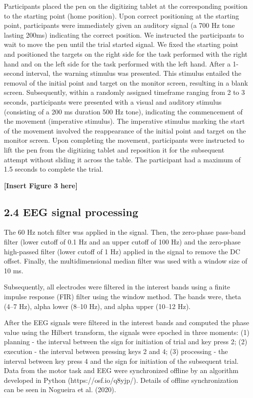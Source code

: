 \documentclass[man,a4paper,12pt,floatsintext]{apa6}
\begin{document}
Participants placed the pen on the digitizing tablet at the corresponding position to the starting point (home position). Upon correct positioning at the starting point, participants were immediately given an auditory signal (a 700 Hz tone lasting 200ms) indicating the correct position. We instructed the participants to wait to move the pen until the trial started signal. We fixed the starting point and positioned the targets on the right side for the task performed with the right hand and on the left side for the task performed with the left hand. After a 1-second interval, the warning stimulus was presented. This stimulus entailed the removal of the initial point and target on the monitor screen, resulting in a blank screen. Subsequently, within a randomly assigned timeframe ranging from 2 to 3 seconds, participants were presented with a visual and auditory stimulus (consisting of a 200 ms duration 500 Hz tone), indicating the commencement of the movement (imperative stimulus). The imperative stimulus marking the start of the movement involved the reappearance of the initial point and target on the monitor screen. Upon completing the movement, participants were instructed to lift the pen from the digitizing tablet and reposition it for the subsequent attempt without sliding it across the table. The participant had a maximum of 1.5 seconds to complete the trial.

\begin{center}
\textbf{[Insert Figure 3 here]}
\end{center}

\subsection{2.4 EEG signal processing}
The 60 Hz notch filter was applied in the signal. Then, the zero-phase pass-band filter (lower cutoff of 0.1 Hz and an upper cutoff of 100 Hz) and the zero-phase high-passed filter (lower cutoff of 1 Hz) applied in the signal to remove the DC offset. Finally, the multidimensional median filter was used with a window size of 10 ms.

Subsequently, all electrodes were filtered in the interest bands using a finite impulse response (FIR) filter using the window method. The bands were, theta (4–7 Hz), alpha lower (8–10 Hz), and alpha upper (10–12 Hz).

After the EEG signals were filtered in the interest bands and computed the phase value using the Hilbert transform, the signals were epoched in three moments: (1) planning - the interval between the sign for initiation of trial and key press 2; (2) execution -  the interval between pressing keys 2 and 4; (3) processing - the interval between key press 4 and the sign for initiation of the subsequent trial. Data from the motor task and EEG were synchronized offline by an algorithm developed in Python (https://osf.io/q8yjp/). Details of offline synchronization can be seen in Nogueira et al. (2020).  
\end{document}
